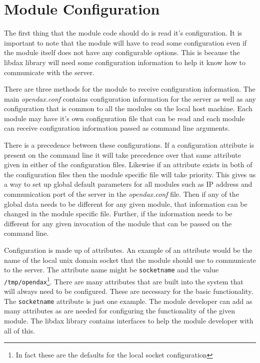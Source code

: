\chapter{Module Configuration}
The first thing that the module code should do is read it's configuration.  It is important to note that the module will have to read some configuration even if the module itself does not have any configurable options.  This is because the libdax library will need some configuration information to help it know how to communicate with the server.

There are three methods for the module to receive configuration information.  The main \textit{opendax.conf} contains configuration information for the server as well as any configuration that is common to all the modules on the local host machine.  Each module may have it's own configuration file that can be read and each module can receive configuration information passed as command line arguments.

There is a precedence between these configurations.  If a configuration attribute is present on the command line it will take precedence over that same attribute given in either of the configuration files.  Likewise if an attribute exists in both of the configuration files then the module specific file will take priority.  This gives us a way to set up global default parameters for all modules such as IP address and communication port of the server in the \textit{opendax.conf} file.  Then if any of the global data needs to be different for any given module, that information can be changed in the module specific file.  Further, if the information needs to be different for any given invocation of the module that can be passed on the command line.

Configuration is made up of attributes.  An example of an attribute would be the name of the local unix domain socket that the module should use to communicate to the server.  The attribute name might be \texttt{socketname} and the value \texttt{/tmp/opendax}\footnote{In fact these are the defaults for the local socket configuration}.  There are many attributes that are built into the system that will always need to be configured.  These are necessary for the basic functionality.  The \texttt{socketname} attribute is just one example.  The module developer can add as many attributes as are needed for configuring the functionality of the given module.  The libdax library contains interfaces to help the module developer with all of this.

